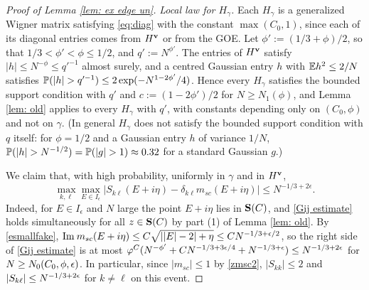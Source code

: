 \begin{proof}[Proof of Lemma \ref{lem: ex edge un}]
\textit{Local law for $H_\gamma$.} Each $H_\gamma$ is a generalized Wigner matrix satisfying \eqref{eq:diag} with the constant $\max(C_0,1)$, since each of its diagonal entries comes from $H^{\mathbf{v}}$ or from the GOE. Let $\phi':=(1/3+\phi)/2$, so that $1/3<\phi'<\phi\le1/2$, and $q':=N^{\phi'}$. The entries of $H^{\mathbf{v}}$ satisfy $|h|\le N^{-\phi}\le q'^{-1}$ almost surely, and a centred Gaussian entry $h$ with $\mathbb{E} h^2\le 2/N$ satisfies $\p(|h|>q'^{-1})\le 2\exp(-N^{1-2\phi'}/4)$. Hence every $H_\gamma$ satisfies the bounded support condition with $q'$ and $c:=(1-2\phi')/2$ for $N\ge N_1(\phi)$, and Lemma \ref{lem: old} applies to every $H_\gamma$ with $q'$, with constants depending only on $(C_0,\phi)$ and not on $\gamma$. (In general $H_\gamma$ does not satisfy the bounded support condition with $q$ itself: for $\phi=1/2$ and a Gaussian entry $h$ of variance $1/N$, $\p(|h|>N^{-1/2})=\p(|g|>1)\approx0.32$ for a standard Gaussian $g$.)

We claim that, with high probability, uniformly in $\gamma$ and in $H^{\mathbf{v}}$,
\begin{equation} \label{eq:S_bound}
\max_{k, \ell} \max_{E \in I_{\epsilon}} |S_{k \ell} (E + i \eta) - \delta_{k \ell} m_{sc} (E + i \eta)| \leq N^{-1/3 + 2\epsilon}.
\end{equation}
Indeed, for $E\in I_\epsilon$ and $N$ large the point $E+i\eta$ lies in ${\bf S}(C)$, and \eqref{Gij estimate} holds simultaneously for all $z\in{\bf S}(C)$ by part (1) of Lemma \ref{lem: old}. By \eqref{esmallfake}, $\mathrm{Im}\: m_{sc}(E+i\eta)\le C\sqrt{||E|-2|+\eta}\le CN^{-1/3+\epsilon/2}$, so the right side of \eqref{Gij estimate} is at most $\varphi^C(N^{-\phi'}+CN^{-1/3+3\epsilon/4}+N^{-1/3+\epsilon})\le N^{-1/3+2\epsilon}$ for $N\ge N_0(C_0,\phi,\epsilon)$. In particular, since $|m_{sc}|\le1$ by \eqref{zmsc2}, $|S_{kk}|\le2$ and $|S_{k\ell}|\le N^{-1/3+2\epsilon}$ for $k\ne\ell$ on this event.


\end{proof}
